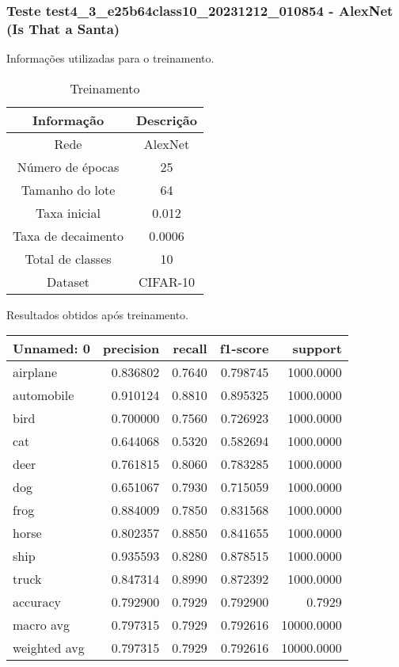 \subsubsection{Teste test4_3_e25b64class10_20231212_010854 - AlexNet (Is That a Santa)}

Informações utilizadas para o treinamento.

\begin{table}[ht]
   \centering
   \caption{Treinamento}
   \label{tab:modelos}
   \begin{tabular}{| c | c | }
      \hline 
      \textbf{Informação} & \textbf{Descrição} \\
      \hline \hline 
      Rede & AlexNet \\
      \hline
      Número de épocas & 25\\
      \hline
      Tamanho do lote & 64\\
      \hline
      Taxa inicial & 0.012 \\
      \hline
      Taxa de decaimento & 0.0006 \\
      \hline
      Total de classes & 10\\
      \hline
      Dataset & CIFAR-10\\
      \hline
   \end{tabular} 
\end{table}

Resultados obtidos após treinamento.

\begin{tabular}{lrrrr}
\toprule
  Unnamed: 0 &  precision &  recall &  f1-score &    support \\
\midrule
    airplane &   0.836802 &  0.7640 &  0.798745 &  1000.0000 \\
  automobile &   0.910124 &  0.8810 &  0.895325 &  1000.0000 \\
        bird &   0.700000 &  0.7560 &  0.726923 &  1000.0000 \\
         cat &   0.644068 &  0.5320 &  0.582694 &  1000.0000 \\
        deer &   0.761815 &  0.8060 &  0.783285 &  1000.0000 \\
         dog &   0.651067 &  0.7930 &  0.715059 &  1000.0000 \\
        frog &   0.884009 &  0.7850 &  0.831568 &  1000.0000 \\
       horse &   0.802357 &  0.8850 &  0.841655 &  1000.0000 \\
        ship &   0.935593 &  0.8280 &  0.878515 &  1000.0000 \\
       truck &   0.847314 &  0.8990 &  0.872392 &  1000.0000 \\
    accuracy &   0.792900 &  0.7929 &  0.792900 &     0.7929 \\
   macro avg &   0.797315 &  0.7929 &  0.792616 & 10000.0000 \\
weighted avg &   0.797315 &  0.7929 &  0.792616 & 10000.0000 \\
\bottomrule
\end{tabular}


